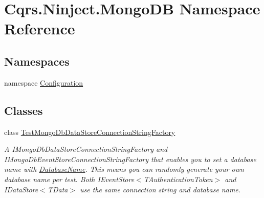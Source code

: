 \hypertarget{namespaceCqrs_1_1Ninject_1_1MongoDB}{}\section{Cqrs.\+Ninject.\+Mongo\+DB Namespace Reference}
\label{namespaceCqrs_1_1Ninject_1_1MongoDB}
\subsection*{Namespaces}
\begin{DoxyCompactItemize}
\item 
namespace \hyperlink{namespaceCqrs_1_1Ninject_1_1MongoDB_1_1Configuration}{Configuration}
\end{DoxyCompactItemize}
\subsection*{Classes}
\begin{DoxyCompactItemize}
\item 
class \hyperlink{classCqrs_1_1Ninject_1_1MongoDB_1_1TestMongoDbDataStoreConnectionStringFactory}{Test\+Mongo\+Db\+Data\+Store\+Connection\+String\+Factory}
\begin{DoxyCompactList}\small\item\em A I\+Mongo\+Db\+Data\+Store\+Connection\+String\+Factory and I\+Mongo\+Db\+Event\+Store\+Connection\+String\+Factory that enables you to set a database name with \hyperlink{classCqrs_1_1Ninject_1_1MongoDB_1_1TestMongoDbDataStoreConnectionStringFactory_a53412e87f2114b8a61d6898f7f290187_a53412e87f2114b8a61d6898f7f290187}{Database\+Name}. This means you can randomly generate your own database name per test. Both I\+Event\+Store$<$\+T\+Authentication\+Token$>$ and I\+Data\+Store$<$\+T\+Data$>$ use the same connection string and database name. \end{DoxyCompactList}\end{DoxyCompactItemize}
